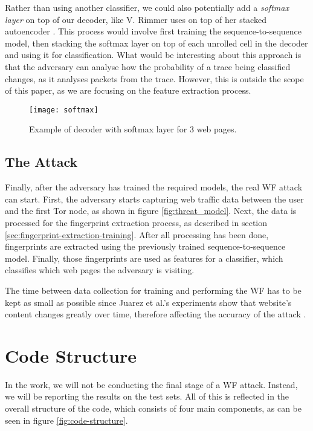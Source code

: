 Rather than using another classifier, we could also potentially add a \textit{softmax layer} on top of our decoder, like V. Rimmer uses on top of her stacked autoencoder \cite{deeplearningthesis}.
This process would involve first training the sequence-to-sequence model, then stacking the softmax layer on top of each unrolled cell in the decoder and using it for classification.
What would be interesting about this approach is that the adversary can analyse how the probability of a trace being classified changes, as it analyses packets from the trace.
However, this is outside the scope of this paper, as we are focusing on the feature extraction process.

\begin{figure}[ht]
  \centering
  \texttt{[image: softmax]}
  \caption{Example of decoder with softmax layer for 3 web pages.}
  \label{fig:softmax}
\end{figure}

\newpage

\subsection{The Attack}

Finally, after the adversary has trained the required models, the real WF attack can start.
First, the adversary starts capturing web traffic data between the user and the first Tor node, as shown in figure \ref{fig:threat_model}.
Next, the data is processed for the fingerprint extraction process, as described in section \ref{sec:fingerprint-extraction-training}.
After all processing has been done, fingerprints are extracted using the previously trained sequence-to-sequence model.
Finally, those fingerprints are used as features for a classifier, which classifies which web pages the adversary is visiting.

The time between data collection for training and performing the WF has to be kept as small as possible since Juarez et al.'s experiments show that website's content changes greatly over time, therefore affecting the accuracy of the attack \cite{wfpevaluation}.

\section{Code Structure}

In the work, we will not be conducting the final stage of a WF attack.
Instead, we will be reporting the results on the test sets.
All of this is reflected in the overall structure of the code, which consists of four main components, as can be seen in figure \ref{fig:code-structure}.


